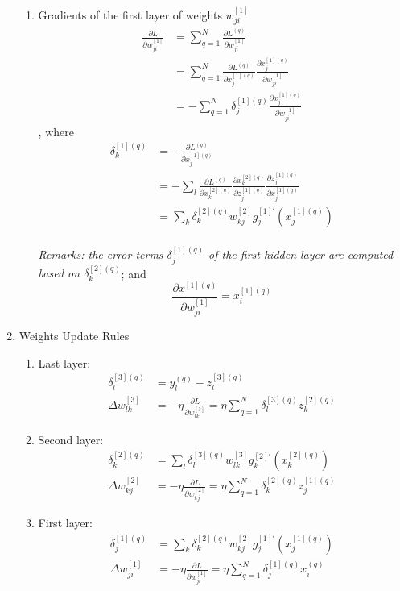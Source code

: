 \documentclass[11pt]{article}
\newcommand\pddx[2]{\frac{\partial{#1}}{\partial{#2}}}
\begin{document}
\begin{enumerate}
\begin{enumerate}
\item Gradients of the first layer of weights $w_{ji}^{[1]}$
\begin{align*}
\pddx{L}{w_{ji}^{[1]}} &= \sum_{q=1}^{N} \pddx{L^{(q)}}{w_{ji}^{[1]}}\\
&= \sum_{q=1}^{N} \pddx{L^{(q)}}{x_j ^{[1](q)}}\pddx{x_j ^{[1](q)}}{w_{ji}^{[1]}}\\
&= - \sum_{q=1}^{N} \delta^{[1](q)}_j \pddx{x_j ^{[1](q)}}{w_{ji}^{[1]}}
\end{align*}, where \begin{align*}
\delta^{[1](q)}_k &= - \pddx{L^{(q)}}{x^{[1](q)}_j}\\
&= - \sum_{l} \pddx{L^{(q)}}{x^{[2](q)}_k} \pddx{x^{[2](q)}_k}{z^{[1](q)}_j} \pddx{z^{[1](q)}_j}{x^{[1](q)}_j}\\
&= \sum_{k} \delta^{[2](q)}_k w^{[2]}_{kj} g^{[1]'}_j (x^{[1](q)}_j)
\end{align*}\\ \textit{Remarks: the error terms $\delta_{j}^{[1](q)}$ of the first hidden layer are computed based on $\delta^{[2](q)}_k$}; and $$\pddx{x^{[1](q)}}{w^{[1]}_{ji}} = x^{[1](q)}_i$$
\end{enumerate}
\item Weights Update Rules
\begin{enumerate}
\item Last layer: \begin{align*}
\delta_{l}^{[3](q)} &= y^{(q)}_{l} - z^{[3](q)}_l\\
\Delta w^{[3]}_{lk} &= -\eta \pddx{L}{w^{[3]}_{lk}} = \eta \sum_{q=1}^{N} \delta^{[3](q)}_{l} z^{[2](q)}_k
\end{align*}
\item Second layer: \begin{align*}
\delta_{k}^{[2](q)} &= \sum_{l} \delta^{[3](q)}_l w^{[3]}_{lk} g^{[2]'}_k (x^{[2](q)}_k)\\
\Delta w^{[2]}_{kj} &= -\eta \pddx{L}{w^{[2]}_{kj}} = \eta \sum_{q=1}^{N} \delta^{[2](q)}_k z^{[1](q)}_j
\end{align*}
\item First layer: \begin{align*}
\delta_{j}^{[1](q)} &= \sum_{k} \delta^{[2](q)}_k w^{[2]}_{kj} g^{[1]'}_j (x^{[1](q)}_j)\\
\Delta w^{[1]}_{ji} &= -\eta \pddx{L}{w^{[1]}_{ji}} = \eta \sum_{q=1}^{N} \delta^{[1](q)}_j x^{(q)}_i
\end{align*}
\end{enumerate}
\end{enumerate}
\end{document}
